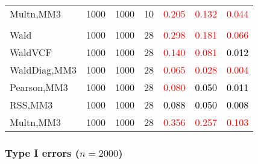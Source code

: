 \documentclass[
]{article}
\begin{document}
\begin{table}[H]
{\begin{tabular}[t]{lrrrrrr}
\hspace{1em}Multn,MM3 & 1000 & 1000 & 10 & \textcolor{red}{0.205} & \textcolor{red}{0.132} & \textcolor{red}{0.044}\\
\addlinespace[0.3em]
\multicolumn{7}{l}{\textbf{3F 15V}}\\
\hspace{1em}Wald & 1000 & 1000 & 28 & \textcolor{red}{0.298} & \textcolor{red}{0.181} & \textcolor{red}{0.066}\\
\hspace{1em}WaldVCF & 1000 & 1000 & 28 & \textcolor{red}{0.140} & \textcolor{red}{0.081} & \textcolor{black}{0.012}\\
\hspace{1em}WaldDiag,MM3 & 1000 & 1000 & 28 & \textcolor{red}{0.065} & \textcolor{red}{0.028} & \textcolor{red}{0.004}\\
\hspace{1em}Pearson,MM3 & 1000 & 1000 & 28 & \textcolor{red}{0.080} & \textcolor{black}{0.050} & \textcolor{black}{0.011}\\
\hspace{1em}RSS,MM3 & 1000 & 1000 & 28 & \textcolor{black}{0.088} & \textcolor{black}{0.050} & \textcolor{black}{0.008}\\
\hspace{1em}Multn,MM3 & 1000 & 1000 & 28 & \textcolor{red}{0.356} & \textcolor{red}{0.257} & \textcolor{red}{0.103}\\
\bottomrule
\end{tabular}}
\endgroup{}
\end{table}

\hypertarget{type-i-errors-n2000-2}{%
\subsubsection{\texorpdfstring{Type I errors
(\(n=2000\))}{Type I errors (n=2000)}}\label{type-i-errors-n2000-2}}
\end{document}
